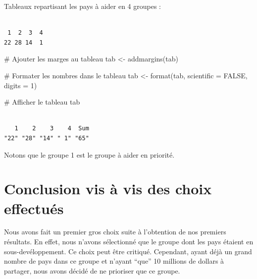 \documentclass[
]{article}
\newenvironment{Shaded}{}{}
\newcommand{\AttributeTok}[1]{#1}
\newcommand{\CommentTok}[1]{\textcolor[rgb]{0.00,0.50,0.00}{#1}}
\newcommand{\ConstantTok}[1]{#1}
\newcommand{\DecValTok}[1]{#1}
\newcommand{\FunctionTok}[1]{#1}
\newcommand{\NormalTok}[1]{#1}
\newcommand{\OtherTok}[1]{\textcolor[rgb]{1.00,0.25,0.00}{#1}}
\newcommand{\SpecialCharTok}[1]{\textcolor[rgb]{0.00,0.50,0.50}{#1}}
\begin{document}
Tableaux repartisant les pays à aider en 4 groupes :

\begin{Shaded}
\end{Shaded}

\begin{verbatim}

 1  2  3  4 
22 28 14  1 
\end{verbatim}

\begin{Shaded}
\begin{Highlighting}[]
\CommentTok{\# Ajouter les marges au tableau}
\NormalTok{tab }\OtherTok{\textless{}{-}} \FunctionTok{addmargins}\NormalTok{(tab)}

\CommentTok{\# Formater les nombres dans le tableau}
\NormalTok{tab }\OtherTok{\textless{}{-}} \FunctionTok{format}\NormalTok{(tab, }\AttributeTok{scientific =} \ConstantTok{FALSE}\NormalTok{, }\AttributeTok{digits =} \DecValTok{1}\NormalTok{)}

\CommentTok{\# Afficher le tableau}
\NormalTok{tab}
\end{Highlighting}
\end{Shaded}

\begin{verbatim}

   1    2    3    4  Sum 
"22" "28" "14" " 1" "65" 
\end{verbatim}

Notons que le groupe 1 est le groupe à aider en priorité.

\hypertarget{conclusion-vis-uxe0-vis-des-choix-effectuuxe9s}{%
\section{Conclusion vis à vis des choix
effectués}\label{conclusion-vis-uxe0-vis-des-choix-effectuuxe9s}}

Nous avons fait un premier gros choix suite à l'obtention de nos
premiers résultats. En effet, nous n'avons sélectionné que le groupe
dont les pays étaient en sous-devéloppement. Ce choix peut être
critiqué. Cependant, ayant déjà un grand nombre de pays dans ce groupe
et n'ayant ``que'' 10 millions de dollars à partager, nous avons décidé
de ne prioriser que ce groupe.
\end{document}
